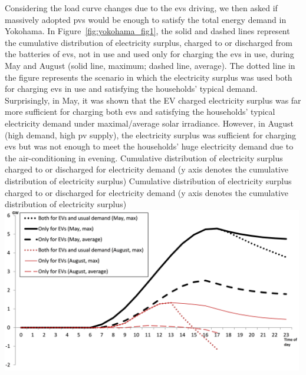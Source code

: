 Considering the load curve changes due to the \glspl{ev} driving, we then asked if massively adopted \glspl{pv} would be enough to satisfy the total energy demand in Yokohama. In Figure~\ref{fig:yokohama_fig1}, the solid and dashed lines represent the cumulative distribution of electricity surplus, charged to or discharged from the batteries of \glspl{ev}, not in use and used only for charging the \glspl{ev} in use, during May and August (solid line, maximum; dashed line, average). The dotted line in the figure represents the scenario in which the electricity surplus was used both for charging \glspl{ev} in use and satisfying the households' typical demand. Surprisingly, in May, it was shown that the EV charged electricity surplus was far more sufficient for charging both \glspl{ev} and satisfying the households' typical electricity demand under maximal/average solar irradiance. However, in August (high demand, high \gls{pv} supply), the electricity surplus was sufficient for charging \glspl{ev} but was not enough to meet the households' huge electricity demand due to the air-conditioning in evening. 
%
\createfigure%
{Cumulative distribution of electricity surplus charged to or discharged for electricity demand (y axis denotes the cumulative distribution of electricity surplus)}%
{Cumulative distribution of electricity surplus charged to or discharged for electricity demand (y axis denotes the cumulative distribution of electricity surplus)}%
{\label{fig:yokohama_fig1}}%
{\includegraphics[width=0.99\textwidth, angle=0]{./scenarios/figures/yokohama_fig1.png}}%
{}

